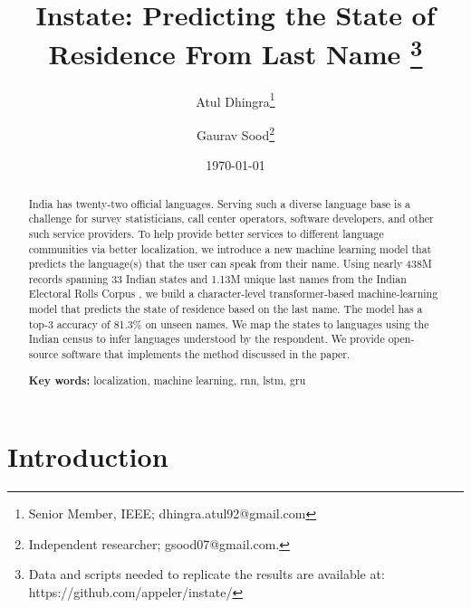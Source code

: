 \documentclass[11pt,  letterpaper]{article}
\title{Instate: Predicting the State of Residence From Last Name
\thanks{Data and scripts needed to replicate the results are available at: https://github.com/appeler/instate/}}
\author{Atul Dhingra\thanks{Senior Member, IEEE; \textsf{dhingra.atul92@gmail.com}} \and Gaurav Sood\thanks{Independent researcher;  \textsf{gsood07@gmail.com}.}}
\date{\today}
\begin{document}
\maketitle

\begin{abstract}

India has twenty-two official languages. Serving such a diverse language base is a challenge for survey statisticians, call center operators, software developers, and other such service providers. To help provide better services to different language communities via better localization, we introduce a new machine learning model that predicts the language(s) that the user can speak from their name. Using nearly 438M records spanning 33 Indian states and 1.13M unique last names from the Indian Electoral Rolls Corpus \citep{DVN/OG47IV_2023}, we build a character-level transformer-based machine-learning model that predicts the state of residence based on the last name. The model has a top-3 accuracy of 81.3\% on unseen names. We map the states to languages using the Indian census to infer languages understood by the respondent. We provide open-source software that implements the method discussed in the paper.

\smallskip

\textbf{Key words:} localization, machine learning, rnn, lstm, gru

\end{abstract}




\section{Introduction}
\end{document}
